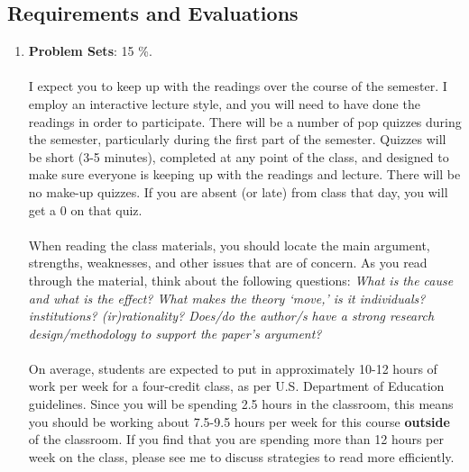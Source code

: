 \documentclass[letterpaper]{article}
\begin{document}
\subsection*{Requirements and Evaluations}

\begin{enumerate}

	\item {\bf Problem Sets}: 15 \%.
	\\
	\\
	I expect you to keep up with the readings over the course of the semester. I employ an interactive lecture style, and you will need to have done the readings in order to participate. There will be a number of pop quizzes during the semester, particularly during the first part of the semester.  Quizzes will be short (3-5 minutes), completed at any point of the class, and designed to make sure everyone is keeping up with the readings and lecture. There will be no make-up quizzes. If you are absent (or late) from class that day, you will get a $0$ on that quiz. 
	\\
	\\
	When reading the class materials, you should locate the main argument, strengths, weaknesses, and other issues that are of concern. As you read through the material, think about the following questions: \emph{What is the cause and what is the effect? What makes the theory `move,' is it individuals? institutions? (ir)rationality? Does/do the author/s have a strong research design/methodology to support the paper's argument?} 
	\\
	\\
	On average, students are expected to put in approximately 10-12 hours of work per week for a four-credit class, as per U.S. Department of Education guidelines.  Since you will be spending 2.5 hours in the classroom, this means you should be working about 7.5-9.5 hours per week for this course {\bf outside} of the classroom. If you find that you are spending more than 12 hours per week on the class, please see me to discuss strategies to read more efficiently. 



\end{enumerate}
\end{document}
